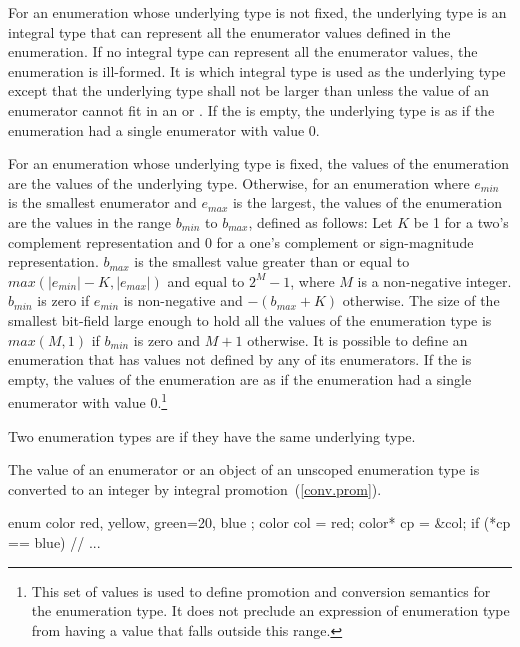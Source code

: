 \pnum
For an enumeration whose underlying type is not fixed,
the underlying type
is an
integral type that can represent all the enumerator values defined in
the enumeration. If no integral type can represent all the enumerator
values, the enumeration is ill-formed. It is 
which integral type is used as the underlying type 
except that the underlying type shall not be larger than 
unless the value of an enumerator cannot fit in an  or
. If the  is empty, the
underlying type is as if the enumeration had a single enumerator with
value 0.

\pnum
For an enumeration whose underlying type is fixed, the values of
the enumeration are the values of the underlying type. Otherwise,
for an enumeration where $e_\mathit{min}$ is the smallest enumerator and
$e_\mathit{max}$ is the largest, the values of the enumeration are the
values in the range $b_{min}$ to $b_{max}$, defined as follows: Let $K$
be 1 for a two's complement representation and 0 for a one's complement
or sign-magnitude representation. $b_{max}$ is the smallest value
greater than or equal to $max(|e_{min}| - K, |e_{max}|)$ and equal to
$2^M-1$, where $M$ is a non-negative integer. $b_{min}$ is zero if
$e_{min}$ is non-negative and $-(b_{max}+K)$ otherwise. The size of the
smallest bit-field large enough to hold all the values of the
enumeration type is $max(M,1)$ if $b_{min}$ is zero and $M+1$ otherwise.
It is possible to define an enumeration that has values not defined by
any of its enumerators. If the  is empty, the
values of the enumeration are as if the enumeration had a single enumerator with
value 0.\footnote{This set of values is used to define promotion and
conversion semantics for the enumeration type. It does not preclude an
expression of enumeration type from having a value that falls outside
this range.}

\pnum
Two enumeration types are  if they have the same
underlying type.

\pnum
The value of an enumerator or an object of an unscoped enumeration type is
converted to an integer by integral promotion~(\ref{conv.prom}).
\enterexample

%
\begin{codeblock}
  enum color { red, yellow, green=20, blue };
  color col = red;
  color* cp = &col;
  if (*cp == blue)              // ...
\end{codeblock}

